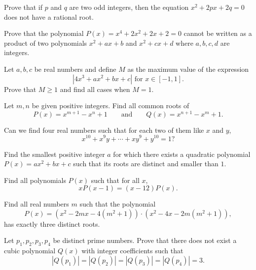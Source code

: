 \begin{question}[name={1907 Hungary}]
    Prove that if $p$ and $q$ are two odd integers, then the equation $x^2+2px+2q=0$ does not have a rational root.
\end{question}


\begin{question}[name={1907 Hungary}]
    Prove that the polynomial $P(x)=x^4+2x^2+2x+2=0$ cannot be written as a product of two polynomials $x^2+ax+b$ and $x^2+cx+d$ where $a,b,c,d$ are integers.
\end{question}


\begin{question}[name={1996 Bulgaria}]
    Let $a,b,c$ be real numbers and define $M$ as the maximum value of the expression
    \[|4x^3+ax^2+bx+c| \text{ for } x\in [-1,1].\]
    Prove that $M\geq 1$ and find all cases when $M=1$.
\end{question}


\begin{question}[name={1994 Romania}]
    Let $m,n$ be given positive integers. Find all common roots of
    \[P(x)=x^{m+1}-x^n+1 \qquad \text{and} \qquad Q(x)=x^{n+1}-x^m+1.\]
\end{question}


\begin{question}[name={1990 Iran}]
    Can we find four real numbers such that for each two of them like $x$ and $y$,
    \[x^{10} + x^9y + \cdots + xy^9 + y^{10} = 1?\]
\end{question}

\begin{question}[name={1969 USSR}]
    Find the smallest positive integer $a$ for which there exists a quadratic polynomial $P(x)=ax^2+bx+c$ such that its roots are distinct and smaller than $1$.
\end{question}

\begin{question}[name={1987 Iran}]
    Find all polynomials $P(x)$ such that for all $x$, \[xP(x-1)=(x-12)P(x).\]
\end{question}

\begin{question}[name={1997 Bulgaria}]
    Find all real numbers $m$ such that the polynomial
    \[P(x)=(x^2-2mx-4(m^2+1))\cdot (x^2-4x-2m(m^2+1)),\]
    has exactly three distinct roots.
\end{question}


\begin{question}[name={1997 Austrian--Polish}]
    Let $p_1,p_2,p_3,p_4$ be distinct prime numbers. Prove that there does not exist a cubic polynomial $Q(x)$ with integer coefficients such that
    \[|Q(p_1)|=|Q(p_2)|=|Q(p_3)|=|Q(p_4)|=3.\]
\end{question}


